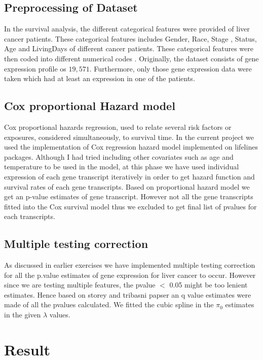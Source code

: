 \documentclass[11pt]{article}
\begin{document}
	\subsection {Preprocessing of Dataset}
In the survival analysis, the different categorical features were provided of liver cancer patients. These categorical features includes Gender, Race, Stage , Status, Age and LivingDays of different cancer patients.  These categorical features were then coded into different numerical codes . Originally, the dataset consists of gene expression profile os $19,571$. Furthermore, only those gene expression data were taken which had at least an expression in one of the patients.  

	\subsection{Cox proportional Hazard model}
	 Cox proportional hazards regression, used to relate several risk factors or exposures, considered simultaneously, to survival time. In the current project we used the implementation of Cox regression hazard model implemented on lifelines packages. Although I had tried including other covariates such as age and temperature to be used in the model, at this phase we have used individual expression of each gene transcript iteratively in order to get hazard function and survival rates of each gene transcripts. Based on proportional hazard model we get an p-value estimates of gene transcript. However not all the gene transcripts fitted into the Cox survival model thus we excluded to get final list of pvalues for each transcripts.
	 
	\subsection {Multiple testing correction}
	As discussed in earlier exercises we have  implemented multiple testing correction for all the p.value estimates of gene expression for liver cancer to occur. However since we are testing multiple features, the pvalue $<$ 0.05 might be too lenient estimates. Hence based on storey and tribasni papser \cite {} an q value estimates were made of all the pvalues calculated. We fitted the cubic spline in the $\pi_0$ estimates in the given  $\lambda$ values.
	 


 \section{Result}
 
\end{document}

